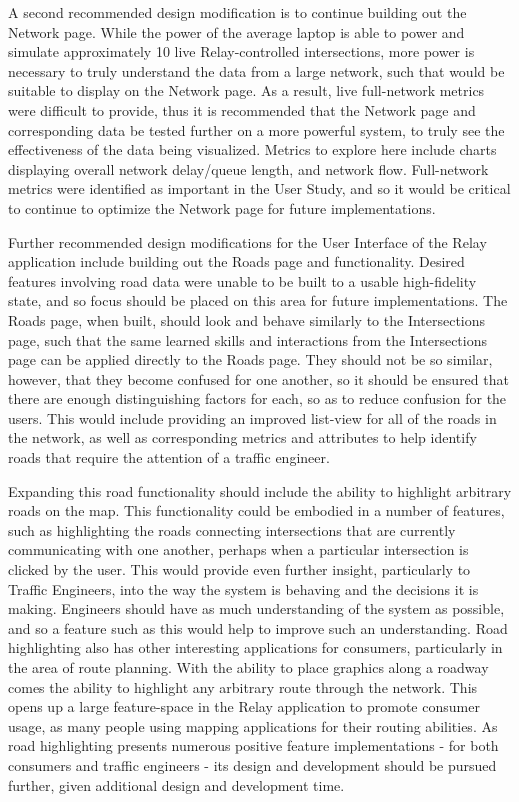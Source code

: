 \documentclass{report}
\begin{document}
A second recommended design modification is to continue building out the Network page.
While the power of the average laptop is able to power and simulate approximately 10 live Relay-controlled intersections, more power is necessary to truly understand the data from a large network, such that would be suitable to display on the Network page.
As a result, live full-network metrics were difficult to provide, thus it is recommended that the Network page and corresponding data be tested further on a more powerful system, to truly see the effectiveness of the data being visualized.
Metrics to explore here include charts displaying overall network delay/queue length, and network flow.
Full-network metrics were identified as important in the User Study, and so it would be critical to continue to optimize the Network page for future implementations.

Further recommended design modifications for the User Interface of the Relay application include building out the Roads page and functionality.
Desired features involving road data were unable to be built to a usable high-fidelity state, and so focus should be placed on this area for future implementations.
The Roads page, when built, should look and behave similarly to the Intersections page, such that the same learned skills and interactions from the Intersections page can be applied directly to the Roads page.
They should not be so similar, however, that they become confused for one another, so it should be ensured that there are enough distinguishing factors for each, so as to reduce confusion for the users.
This would include providing an improved list-view for all of the roads in the network, as well as corresponding metrics and attributes to help identify roads that require the attention of a traffic engineer.

Expanding this road functionality should include the ability to highlight arbitrary roads on the map.
This functionality could be embodied in a number of features, such as highlighting the roads connecting intersections that are currently communicating with one another, perhaps when a particular intersection is clicked by the user.
This would provide even further insight, particularly to Traffic Engineers, into the way the system is behaving and the decisions it is making.
Engineers should have as much understanding of the system as possible, and so a feature such as this would help to improve such an understanding.
Road highlighting also has other interesting applications for consumers, particularly in the area of route planning.
With the ability to place graphics along a roadway comes the ability to highlight any arbitrary route through the network.
This opens up a large feature-space in the Relay application to promote consumer usage, as many people using mapping applications for their routing abilities.
As road highlighting presents numerous positive feature implementations - for both consumers and traffic engineers - its design and development should be pursued further, given additional design and development time.
\end{document}

